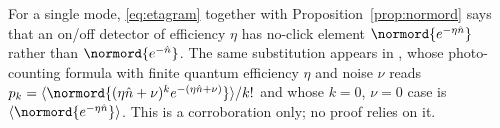 
\begin{remark}\label{rem:sperlingeta}
For a single mode, \eqref{eq:etagram} together with
Proposition~\ref{prop:normord} says that an on/off detector of efficiency
$\eta$ has no-click element $\normord{e^{-\eta\hat n}}$ rather than
$\normord{e^{-\hat n}}$. The same substitution appears in
\cite[Eq.~(3)]{sperling2012}, whose photo-counting formula with finite quantum
efficiency $\eta$ and noise $\nu$ reads
$p_k=\langle\normord{(\eta\hat n+\nu)^ke^{-(\eta\hat n+\nu)}}\rangle/k!$ and
whose $k=0$, $\nu=0$ case is $\langle\normord{e^{-\eta\hat n}}\rangle$.
This is a corroboration only; no proof relies on it.
\end{remark}
